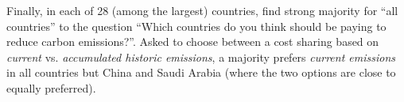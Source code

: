 Finally, in each of 28 (among the largest) countries, \citet{dabla-norris_public_2023} find strong majority for ``all countries'' to the question ``Which countries do you think should be paying to reduce carbon emissions?''. Asked to choose between a cost sharing based on \textit{current} vs. \textit{accumulated historic emissions}, a majority prefers \textit{current emissions} in all countries but China and Saudi Arabia (where the two options are close to equally preferred). %


